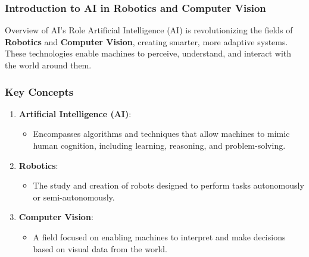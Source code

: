 \documentclass[aspectratio=169]{beamer}
\begin{document}
\frame{\titlepage}

\begin{frame}[fragile]
    \frametitle{Introduction to AI in Robotics and Computer Vision}
    
    \begin{block}{Overview of AI’s Role}
        Artificial Intelligence (AI) is revolutionizing the fields of \textbf{Robotics} and \textbf{Computer Vision}, creating smarter, more adaptive systems. These technologies enable machines to perceive, understand, and interact with the world around them.
    \end{block}
\end{frame}

\begin{frame}[fragile]
    \frametitle{Key Concepts}
    
    \begin{enumerate}
        \item \textbf{Artificial Intelligence (AI)}: 
            \begin{itemize}
                \item Encompasses algorithms and techniques that allow machines to mimic human cognition, including learning, reasoning, and problem-solving.
            \end{itemize}
        
        \item \textbf{Robotics}: 
            \begin{itemize}
                \item The study and creation of robots designed to perform tasks autonomously or semi-autonomously.
            \end{itemize}
        
        \item \textbf{Computer Vision}: 
            \begin{itemize}
                \item A field focused on enabling machines to interpret and make decisions based on visual data from the world.
            \end{itemize}
    \end{enumerate}
\end{frame}
\end{document}
